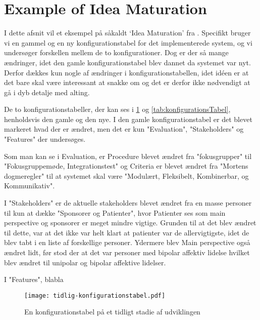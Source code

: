 \section{Example of Idea Maturation}
I dette afsnit vil et eksempel på såkaldt `Idea Maturation' fra \citet[Kapitel 23]{art:essence}.
Specifikt bruger vi en gammel og en ny konfigurationstabel for det implementerede system, og vi undersøger forskellen mellem de to konfigurationer.
Dog er der så mange ændringer, idet den gamle konfigurationstabel blev dannet da systemet var nyt. 
Derfor dækkes kun nogle af ændringer i konfigurationstabellen, idet idéen er at det bare skal være interessant at snakke om og det er derfor ikke nødvendigt at gå i dyb detalje med alting.

De to konfigurationstabeller, der kan ses i \cref{tab:tidligKonfigurationsTabel} og \cref{tab:konfigurationsTabel}, henholdsvis den gamle og den nye. 
I den gamle konfigurationstabel er det blevet markeret hvad der er ændret, men det er kun "Evaluation", "Stakeholders" og "Features" der undersøges. 

Som man kan se i Evaluation, er Procedure blevet ændret fra "fokusgrupper" til "Fokusgruppemøde, Integrationstest" og Criteria er blevet ændret fra "Mortens dogmeregler" til at systemet skal være "Modulært, Fleksibelt, Kombinerbar, og Kommunikativ". 

I "Stakeholders" er de aktuelle stakeholders blevet ændret fra en masse personer til kun at dække "Sponsorer og Patienter", hvor Patienter ses som main perspective og sponsorer er meget mindre vigtige. 
Grunden til at det blev ændret til dette, var at det ikke var helt klart at patienter var de allervigtigste, idet de blev tabt i en liste af forskellige personer.
Ydermere blev Main perspective også ændret lidt, før stod der at det var personer med bipolar affektiv lidelse hvilket blev ændret til unipolar og bipolar affektive lidelser. 

I "Features", blabla

\begin{figure}
	\texttt{[image: tidlig-konfigurationstabel.pdf]}
	\caption{En konfigurationstabel på et tidligt stadie af udviklingen}
	\label{tab:tidligKonfigurationsTabel}
\end{figure}